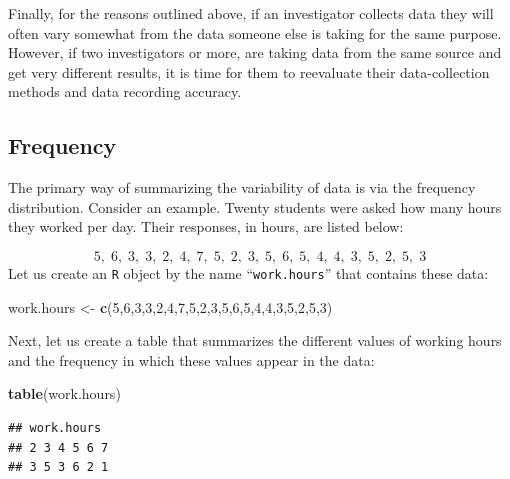 \documentclass[
]{krantz}
\makeatletter
\newenvironment{Shaded}{\begin{snugshade}}{\end{snugshade}}
\newcommand{\DecValTok}[1]{\textcolor[rgb]{0.00,0.00,0.81}{#1}}
\newcommand{\KeywordTok}[1]{\textcolor[rgb]{0.13,0.29,0.53}{\textbf{#1}}}
\newcommand{\NormalTok}[1]{#1}
\newcommand{\StringTok}[1]{\textcolor[rgb]{0.31,0.60,0.02}{#1}}
\newenvironment{kframe}{%
\medskip{}
\setlength{\fboxsep}{.8em}
 \def\at@end@of@kframe{}%
 \ifinner\ifhmode%
  \def\at@end@of@kframe{\end{minipage}}%
  \begin{minipage}{\columnwidth}%
 \fi\fi%
 \def\FrameCommand##1{\hskip\@totalleftmargin \hskip-\fboxsep
 \colorbox{shadecolor}{##1}\hskip-\fboxsep
     \hskip-\linewidth \hskip-\@totalleftmargin \hskip\columnwidth}%
 \MakeFramed {\advance\hsize-\width
   \@totalleftmargin\z@ \linewidth\hsize
   \@setminipage}}%
 {\par\unskip\endMakeFramed%
 \at@end@of@kframe}
\renewenvironment{Shaded}{\begin{kframe}}{\end{kframe}}
\theoremstyle{definition}
\theoremstyle{definition}
\theoremstyle{definition}
\theoremstyle{remark}
\makeatother
\begin{document}
Finally, for the reasons outlined above, if an investigator collects data they will often vary somewhat from the data someone else is taking for the same purpose. However, if two investigators or more, are taking data from the same source and get very different results, it is time for them to reevaluate their data-collection methods and data recording accuracy.

\hypertarget{frequency}{%
\subsection{Frequency}\label{frequency}}

The primary way of summarizing the variability of data is via the frequency distribution. Consider an example. Twenty students were asked how many hours they worked per day. Their responses, in hours, are listed below:

\[5,\; 6,\; 3,\; 3,\; 2,\; 4,\; 7,\; 5,\; 2,\; 3,\; 5,\; 6,\; 5,\; 4,\; 4,\; 3,\; 5,\; 2,\; 5,\; 3\]
Let us create an \texttt{R} object by the name ``\texttt{work.hours}'' that contains these data:

\begin{Shaded}
\begin{Highlighting}[]
\NormalTok{work.hours <-}\StringTok{ }\KeywordTok{c}\NormalTok{(}\DecValTok{5}\NormalTok{,}\DecValTok{6}\NormalTok{,}\DecValTok{3}\NormalTok{,}\DecValTok{3}\NormalTok{,}\DecValTok{2}\NormalTok{,}\DecValTok{4}\NormalTok{,}\DecValTok{7}\NormalTok{,}\DecValTok{5}\NormalTok{,}\DecValTok{2}\NormalTok{,}\DecValTok{3}\NormalTok{,}\DecValTok{5}\NormalTok{,}\DecValTok{6}\NormalTok{,}\DecValTok{5}\NormalTok{,}\DecValTok{4}\NormalTok{,}\DecValTok{4}\NormalTok{,}\DecValTok{3}\NormalTok{,}\DecValTok{5}\NormalTok{,}\DecValTok{2}\NormalTok{,}\DecValTok{5}\NormalTok{,}\DecValTok{3}\NormalTok{)}
\end{Highlighting}
\end{Shaded}

Next, let us create a table that summarizes the different values of working hours and the frequency in which these values appear in the data:

\begin{Shaded}
\begin{Highlighting}[]
\KeywordTok{table}\NormalTok{(work.hours)}
\end{Highlighting}
\end{Shaded}

\begin{verbatim}
## work.hours
## 2 3 4 5 6 7 
## 3 5 3 6 2 1
\end{verbatim}
\end{document}
